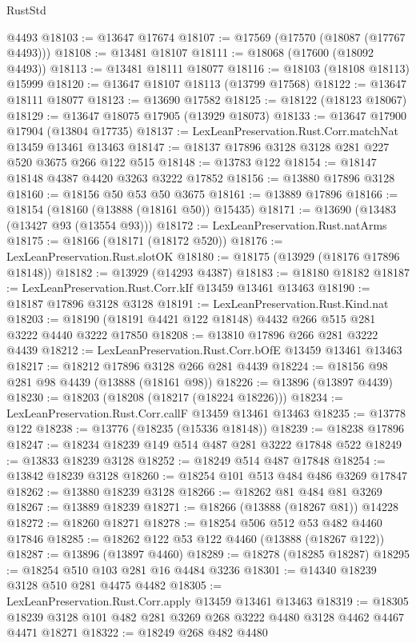 \begin{lexlean}{RustStd}
\begin{coremodule}
    @4493
@18103 := @13647 @17674
@18107 := @17569 (@17570 (@18087 (@17767 @4493)))
@18108 := @13481 @18107
@18111 := @18068 (@17600 (@18092 @4493))
@18113 := @13481 @18111 @18077
@18116 := @18103 (@18108 @18113) @15999
@18120 := @13647 @18107 @18113 (@13799 @17568)
@18122 := @13647 @18111 @18077
@18123 := @13690 @17582
@18125 := @18122 (@18123 @18067)
@18129 := @13647 @18075 @17905 (@13929 @18073)
@18133 := @13647 @17900 @17904 (@13804 @17735)
@18137 := LexLeanPreservation.Rust.Corr.matchNat @13459 @13461 @13463
@18147 := @18137 @17896 @3128 @3128 @281 @227 @520 @3675 @266 @122 @515
@18148 := @13783 @122
@18154 := @18147 @18148 @4387 @4420 @3263 @3222 @17852
@18156 := @13880 @17896 @3128
@18160 := @18156 @50 @53 @50 @3675
@18161 := @13889 @17896
@18166 := @18154 (@18160 (@13888 (@18161 @50)) @15435)
@18171 := @13690 (@13483 (@13427 @93 (@13554 @93)))
@18172 := LexLeanPreservation.Rust.natArms
@18175 := @18166 (@18171 (@18172 @520))
@18176 := LexLeanPreservation.Rust.slotOK
@18180 := @18175 (@13929 (@18176 @17896 @18148))
@18182 := @13929 (@14293 @4387)
@18183 := @18180 @18182
@18187 := LexLeanPreservation.Rust.Corr.kIf @13459 @13461 @13463
@18190 := @18187 @17896 @3128 @3128
@18191 := LexLeanPreservation.Rust.Kind.nat
@18203 := @18190 (@18191 @4421 @122 @18148) @4432 @266 @515 @281 @3222 @4440 @3222 @17850
@18208 := @13810 @17896 @266 @281 @3222 @4439
@18212 := LexLeanPreservation.Rust.Corr.bOfE @13459 @13461 @13463
@18217 := @18212 @17896 @3128 @266 @281 @4439
@18224 := @18156 @98 @281 @98 @4439 (@13888 (@18161 @98))
@18226 := @13896 (@13897 @4439)
@18230 := @18203 (@18208 (@18217 (@18224 @18226)))
@18234 := LexLeanPreservation.Rust.Corr.callF @13459 @13461 @13463
@18235 := @13778 @122
@18238 := @13776 (@18235 (@15336 @18148))
@18239 := @18238 @17896
@18247 := @18234 @18239 @149 @514 @487 @281 @3222 @17848 @522
@18249 := @13833 @18239 @3128
@18252 := @18249 @514 @487 @17848
@18254 := @13842 @18239 @3128
@18260 := @18254 @101 @513 @484 @486 @3269 @17847
@18262 := @13880 @18239 @3128
@18266 := @18262 @81 @484 @81 @3269
@18267 := @13889 @18239
@18271 := @18266 (@13888 (@18267 @81)) @14228
@18272 := @18260 @18271
@18278 := @18254 @506 @512 @53 @482 @4460 @17846
@18285 := @18262 @122 @53 @122 @4460 (@13888 (@18267 @122))
@18287 := @13896 (@13897 @4460)
@18289 := @18278 (@18285 @18287)
@18295 := @18254 @510 @103 @281 @16 @4484 @3236
@18301 := @14340 @18239 @3128 @510 @281 @4475 @4482
@18305 := LexLeanPreservation.Rust.Corr.apply @13459 @13461 @13463
@18319 := @18305 @18239 @3128 @101 @482 @281 @3269 @268 @3222 @4480 @3128 @4462 @4467 @4471 @18271
@18322 := @18249 @268 @482 @4480

\end{coremodule}
\end{lexlean}
